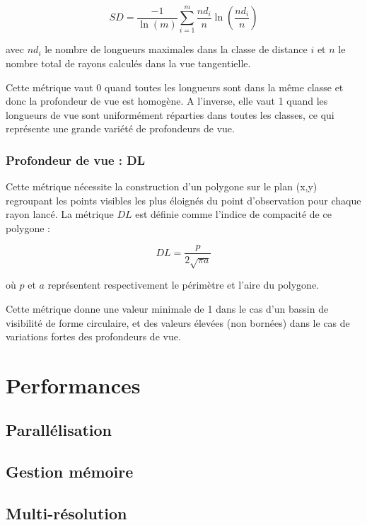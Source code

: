 \documentclass{report}
\begin{document}
$$SD = \frac{-1}{\ln(m)}\sum_{i=1}^{m}\frac{nd_i}{n}\ln\left(\frac{nd_i}{n}\right)$$

avec $nd_i$ le nombre de longueurs maximales dans la classe de distance $i$ et $n$ le nombre total de rayons calculés dans la vue tangentielle.

Cette métrique vaut 0 quand toutes les longueurs sont dans la même classe et donc la profondeur de vue est homogène. A l’inverse, elle vaut 1 quand les longueurs de vue sont uniformément réparties dans toutes les classes, ce qui représente une grande variété de profondeurs de vue.

\subsection{Profondeur de vue : DL}
Cette métrique nécessite la construction d’un polygone sur le plan (x,y) regroupant les points visibles les plus éloignés du point d’observation pour chaque rayon lancé. La métrique $DL$ est définie comme l’indice de compacité de ce polygone : 

$$DL=\frac{p}{2\sqrt{\pi a}}$$

où $p$ et $a$ représentent respectivement le périmètre et l’aire du polygone. 

Cette métrique donne une valeur minimale de 1 dans le cas d’un bassin de visibilité de forme circulaire, et des valeurs élevées (non bornées) dans le cas de variations fortes des profondeurs de vue.


\chapter{Performances}
\label{perf}

\section{Parallélisation}

\section{Gestion mémoire}

\section{Multi-résolution}
\end{document}
